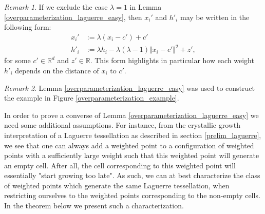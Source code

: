 \documentclass{article}
\newcommand{\RR}{\mathbb{R}}
\theoremstyle{plain}
\theoremstyle{remark}
\newtheorem{remark}{Remark}
\theoremstyle{definition}
\begin{document}

\begin{remark}
    If we exclude the case $\lambda = 1$ in Lemma \ref{overparameterization_laguerre_easy}, then $x_i'$ and $h'_i$ may be written in the following form:
    \begin{align*}
    x_i' &:= \lambda (x_i - c') + c'\\
    h'_i &:= \lambda h_i - \lambda(\lambda - 1)\Vert x_i - c' \Vert^2 + z',
\end{align*}
for some $c' \in \RR^d$ and $z' \in \RR$. This form highlights in particular how each weight $h'_i$ depends on the distance of $x_i$ to $c'$.
\end{remark}

\begin{remark}
    Lemma \ref{overparameterization_laguerre_easy} was used to construct the example in Figure \ref{overparameterization_example}.
\end{remark}

In order to prove a converse of Lemma \ref{overparameterization_laguerre_easy} we need some additional assumptions. For instance, from the crystallic growth interpretation of a Laguerre tessellation as described in section \ref{prelim_laguerre}, we see that one can always add a weighted point to a configuration of weighted points with a sufficiently large weight such that this weighted point will generate an empty cell. After all, the cell corresponding to this weighted point will essentially "start growing too late". As such, we can at best characterize the class of weighted points which generate the same Laguerre tessellation, when restricting ourselves to the weighted points corresponding to the non-empty cells. In the theorem below we present such a characterization. 
\end{document}
